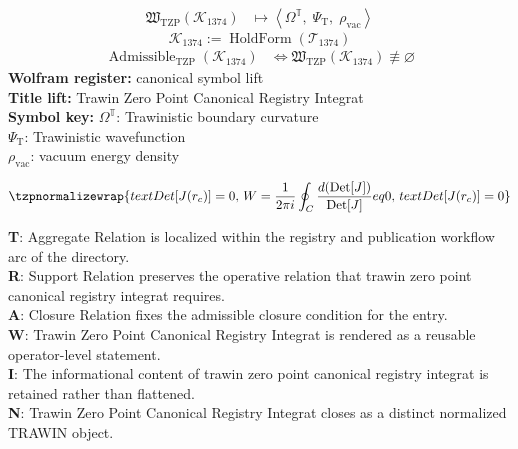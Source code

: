 \noindent
\begin{minipage}[t]{0.48\linewidth}
\begingroup
\small
\[
\begin{aligned}
\mathfrak{W}_{\mathrm{TZP}}\!\left(\mathcal{K}_{1374}\right)
&\longmapsto
\left\langle \Omega^{\mathbb{T}},\; \Psi_{\mathrm{T}},\; \rho_{\mathrm{vac}} \right\rangle
\end{aligned}
\]
\[
\mathcal{K}_{1374}
:=
\operatorname{HoldForm}\!\left(\mathcal{T}_{1374}\right)
\]
\[
\begin{aligned}
\operatorname{Admissible}_{\mathrm{TZP}}\!\left(\mathcal{K}_{1374}\right)
&\Longleftrightarrow
\mathfrak{W}_{\mathrm{TZP}}\!\left(\mathcal{K}_{1374}\right)\not\equiv\varnothing
\end{aligned}
\]
\textbf{Wolfram register:} canonical symbol lift\\
\textbf{Title lift:} Trawin Zero Point Canonical Registry Integrat\\
\textbf{Symbol key:} \(\Omega^{\mathbb{T}}\): Trawinistic boundary curvature\\ \(\Psi_{\mathrm{T}}\): Trawinistic wavefunction\\ \(\rho_{\mathrm{vac}}\): vacuum energy density
\par
\endgroup
\end{minipage}\hfill
\begin{minipage}[t]{0.48\linewidth}
\[
\tzpnormalizewrap{text{Det}[J(r_c)] = 0,\,W = \frac{1}{2\pi i} \oint_C \frac{d(\text{Det}[J])}{{\rm Det}[J]}  eq 0,\,text{Det}[J(r_c)] = 0}
\]

\small
\textbf{T}: Aggregate Relation is localized within the registry and publication workflow arc of the directory.\\
\textbf{R}: Support Relation preserves the operative relation that trawin zero point canonical registry integrat requires.\\
\textbf{A}: Closure Relation fixes the admissible closure condition for the entry.\\
\textbf{W}: Trawin Zero Point Canonical Registry Integrat is rendered as a reusable operator-level statement.\\
\textbf{I}: The informational content of trawin zero point canonical registry integrat is retained rather than flattened.\\
\textbf{N}: Trawin Zero Point Canonical Registry Integrat closes as a distinct normalized TRAWIN object.
\normalsize
\end{minipage}

